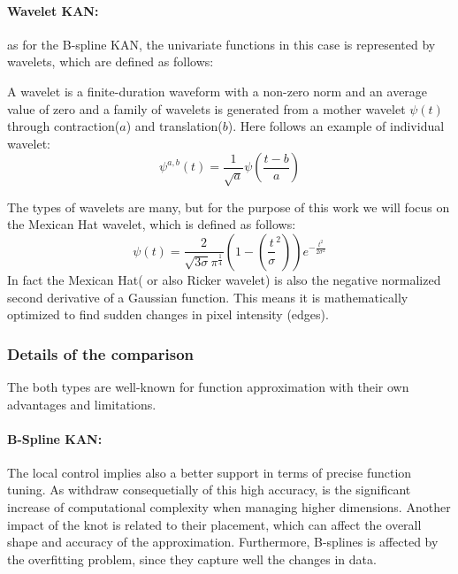 \documentclass[11pt,a4paper,twocolumn]{article}
\begin{document}
    \paragraph{Wavelet KAN:} as for the B-spline KAN, the univariate functions in this case is represented by wavelets, which are defined as follows:
    \begin{theorem}
        A wavelet is a finite-duration waveform with a non-zero norm and an average value of zero and a family of wavelets is generated from a mother wavelet $\psi(t)$ through contraction($a$) and translation($b$).
        Here follows an example of individual wavelet:
        \begin{equation}
            \label{eq:individual_wavelet}
            \psi^{a,b}(t) = \frac{1}{\sqrt{a}} \psi\left(\frac{t-b}{a}\right)
        \end{equation}
        \end{theorem}
        The types of wavelets are many, but for the purpose of this work we will focus on the Mexican Hat wavelet, which is defined as follows:
        \begin{equation}
        \label{eq:MessicanHat}
        \psi(t)=\frac{2}{\sqrt{3\sigma}\pi^{\frac{1}{4}}}\left(1-\left(\frac{t}{\sigma}^2\right)\right)e^{-\frac{t^2}{2\sigma^2}}
        \end{equation}
        In fact the Mexican Hat( or also Ricker wavelet) is also the negative normalized second derivative of a Gaussian function. 
        This means it is mathematically optimized to find sudden changes in pixel intensity (edges)\cite{10.1098/rspb.1980.0020}.


    \subsubsection{Details of the comparison\cite{bozorgasl2024wavkanwaveletkolmogorovarnoldnetworks}}
    \label{subsubsec:actual_comparison}
    The both types are well-known for function approximation with their own advantages and limitations. 
    \paragraph{B-Spline KAN:}The local control implies also a better support in terms of precise function tuning.
                            As withdraw consequetially of this high accuracy, is the significant increase of computational complexity
                            when managing higher dimensions. Another impact of the knot is related to their
                            placement, which can affect the overall shape and accuracy of the approximation.
                            Furthermore, B-splines is affected by the overfitting problem, since they capture well the changes
                            in data.
\end{document}
